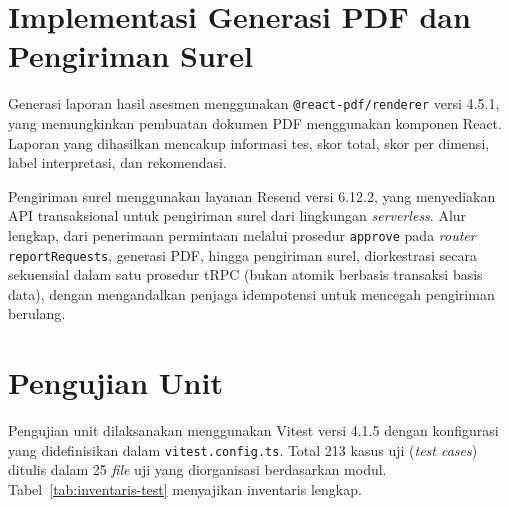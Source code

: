 \section{Implementasi Generasi PDF dan Pengiriman Surel}
\label{sec:impl-pdf-email}

Generasi laporan hasil asesmen menggunakan \texttt{@react-pdf/renderer} versi 4.5.1, yang memungkinkan pembuatan dokumen PDF menggunakan komponen React. Laporan yang dihasilkan mencakup informasi tes, skor total, skor per dimensi, label interpretasi, dan rekomendasi.

Pengiriman surel menggunakan layanan Resend versi 6.12.2, yang menyediakan API transaksional untuk pengiriman surel dari lingkungan \textit{serverless}. Alur lengkap, dari penerimaan permintaan melalui prosedur \texttt{approve} pada \textit{router} \texttt{reportRequests}, generasi PDF, hingga pengiriman surel, diorkestrasi secara sekuensial dalam satu prosedur tRPC (bukan atomik berbasis transaksi basis data), dengan mengandalkan penjaga idempotensi untuk mencegah pengiriman berulang.

\section{Pengujian Unit}
\label{sec:impl-unit-test}

Pengujian unit dilaksanakan menggunakan Vitest versi 4.1.5 dengan konfigurasi yang didefinisikan dalam \texttt{vitest.config.ts}. Total 213 kasus uji (\textit{test cases}) ditulis dalam 25 \textit{file} uji yang diorganisasi berdasarkan modul. Tabel~\ref{tab:inventaris-test} menyajikan inventaris lengkap.

